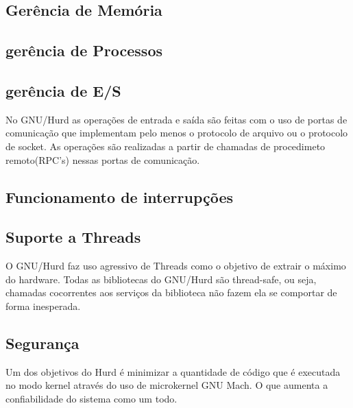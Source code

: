 \documentclass[conference]{IEEEtran}
\begin{document}
\subsection{Gerência de Memória}\label{sec:HurdMem}

\subsection{gerência de Processos}\label{sec:HURDPROC}

\subsection{gerência de E/S}\label{sec:HurdES}
No GNU/Hurd as operações de entrada e saída são feitas com o uso de portas de comunicação que implementam pelo menos o protocolo de arquivo ou o protocolo de socket. As operações são realizadas a partir de chamadas de procedimeto remoto(RPC's) nessas portas de comunicação\cite{HurdIO}.

\subsection{Funcionamento de interrupções}\label{sec:HurdInt}

\subsection{Suporte a Threads}\label{sec:HurdThreads}
O GNU/Hurd faz uso agressivo de Threads como o objetivo de extrair o máximo do hardware.\cite{Hurd} Todas as bibliotecas do GNU/Hurd são thread-safe, ou seja, chamadas cocorrentes aos serviços da biblioteca não fazem ela se comportar de forma inesperada.

\subsection{Segurança}\label{sec:HurdSec}
Um dos objetivos do Hurd é minimizar a quantidade de código que é executada no modo kernel através do uso de microkernel GNU Mach. O que aumenta a confiabilidade do sistema como um todo.



\end{document}
